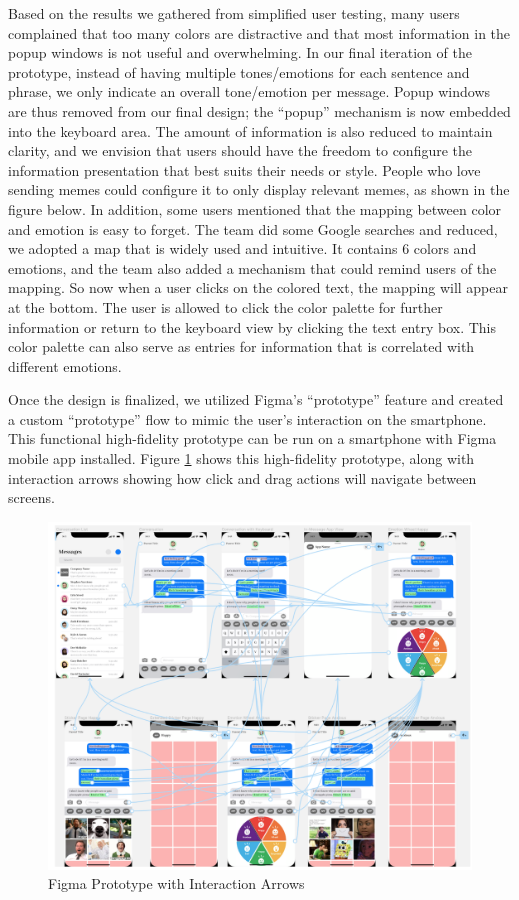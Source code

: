 \documentclass[acmsmall,screen,authorversion,nonacm]{acmart}
\begin{document}
Based on the results we gathered from simplified user testing, many users complained that too many colors are distractive and that most information in the popup windows is not useful and overwhelming. In our final iteration of the prototype, instead of having multiple tones/emotions for each sentence and phrase, we only indicate an overall tone/emotion per message. Popup windows are thus removed from our final design; the “popup” mechanism is now embedded into the keyboard area. The amount of information is also reduced to maintain clarity, and we envision that users should have the freedom to configure the information presentation that best suits their needs or style. People who love sending memes could configure it to only display relevant memes, as shown in the figure below. In addition, some users mentioned that the mapping between color and emotion is easy to forget. The team did some Google searches and reduced, we adopted a map that is widely used and intuitive. It contains 6 colors and emotions, and the team also added a mechanism that could remind users of the mapping. So now when a user clicks on the colored text, the mapping will appear at the bottom. The user is allowed to click the color palette for further information or return to the keyboard view by clicking the text entry box. This color palette can also serve as entries for information that is correlated with different emotions. 

Once the design is finalized, we utilized Figma’s “prototype” feature and created a custom “prototype” flow to mimic the user’s interaction on the smartphone. This functional high-fidelity prototype can be run on a smartphone with Figma mobile app installed. Figure \ref{fig:figmaprototype} shows this high-fidelity prototype, along with interaction arrows showing how click and drag actions will navigate between screens.

\begin{figure}[H]
\begin{center}
\includegraphics[width=1.0\linewidth]{figures/Figma_Prototype.png}
\caption{Figma Prototype with Interaction Arrows}
\label{fig:figmaprototype}
\Description{}
\end{center}
\end{figure}
\end{document}
